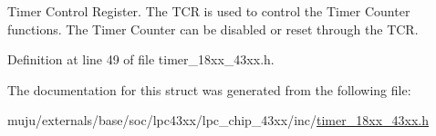 Timer Control Register. The T\+CR is used to control the Timer Counter functions. The Timer Counter can be disabled or reset through the T\+CR. 

Definition at line 49 of file timer\+\_\+18xx\+\_\+43xx.\+h.



The documentation for this struct was generated from the following file\+:\begin{DoxyCompactItemize}
\item 
muju/externals/base/soc/lpc43xx/lpc\+\_\+chip\+\_\+43xx/inc/\hyperlink{timer__18xx__43xx_8h}{timer\+\_\+18xx\+\_\+43xx.\+h}\end{DoxyCompactItemize}

